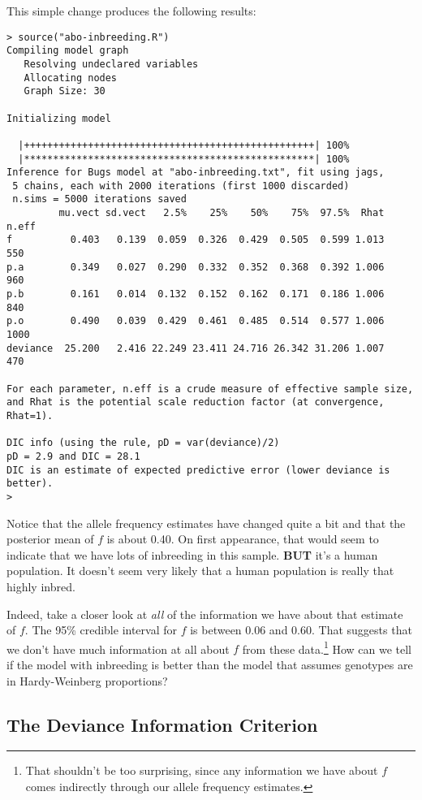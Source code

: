 \documentclass[12pt]{article}
\begin{document}
This simple change produces the following results:
\begin{verbatim}
> source("abo-inbreeding.R")
Compiling model graph
   Resolving undeclared variables
   Allocating nodes
   Graph Size: 30

Initializing model

  |++++++++++++++++++++++++++++++++++++++++++++++++++| 100%
  |**************************************************| 100%
Inference for Bugs model at "abo-inbreeding.txt", fit using jags,
 5 chains, each with 2000 iterations (first 1000 discarded)
 n.sims = 5000 iterations saved
         mu.vect sd.vect   2.5%    25%    50%    75%  97.5%  Rhat n.eff
f          0.403   0.139  0.059  0.326  0.429  0.505  0.599 1.013   550
p.a        0.349   0.027  0.290  0.332  0.352  0.368  0.392 1.006   960
p.b        0.161   0.014  0.132  0.152  0.162  0.171  0.186 1.006   840
p.o        0.490   0.039  0.429  0.461  0.485  0.514  0.577 1.006  1000
deviance  25.200   2.416 22.249 23.411 24.716 26.342 31.206 1.007   470

For each parameter, n.eff is a crude measure of effective sample size,
and Rhat is the potential scale reduction factor (at convergence, Rhat=1).

DIC info (using the rule, pD = var(deviance)/2)
pD = 2.9 and DIC = 28.1
DIC is an estimate of expected predictive error (lower deviance is better).
>
\end{verbatim}
Notice that the allele frequency estimates have changed quite a bit
and that the posterior mean of $f$ is about 0.40. On first appearance,
that would seem to indicate that we have lots of inbreeding in this
sample. {\bf BUT} it's a human population. It doesn't seem very
likely that a human population is really that highly inbred.

Indeed, take a closer look at {\it all\/} of the information we have
about that estimate of $f$. The 95\% credible interval for $f$ is
between 0.06 and 0.60. That suggests that we don't have much
information at all about $f$ from these data.\footnote{That shouldn't
  be too surprising, since any information we have about $f$ comes
  indirectly through our allele frequency estimates.} How can we tell
if the model with inbreeding is better than the model that assumes
genotypes are in Hardy-Weinberg proportions?

\subsection*{The Deviance Information Criterion}
\end{document}
